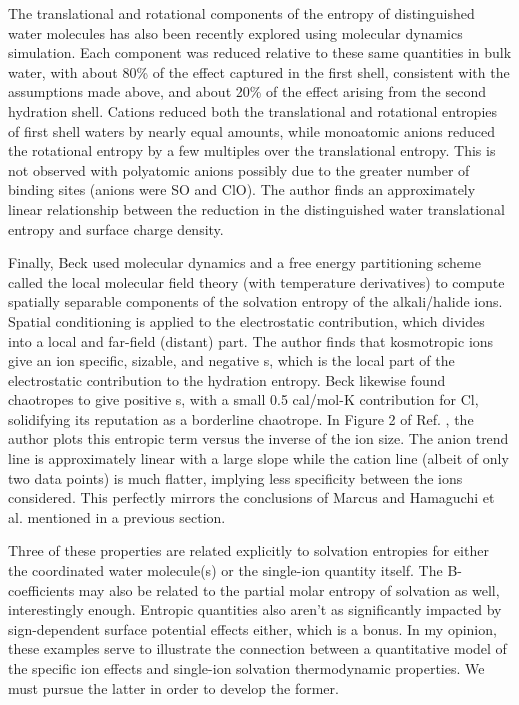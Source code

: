 \begin{intro}
    The translational and rotational components of the entropy of distinguished water molecules has also been recently explored using molecular dynamics 
    simulation\cite{saha2016impact}. Each component was reduced relative to these same quantities in bulk water, with about 80\% of the effect captured in the first shell, 
    consistent with the assumptions made above, and about 20\% of the effect arising from the second hydration shell. Cations reduced both the translational and rotational 
    entropies of first shell waters by nearly equal amounts, while monoatomic anions reduced the rotational entropy by a few multiples over the translational entropy. 
    This is not observed with polyatomic anions possibly due to the greater number of binding sites (anions were SO and ClO). The author finds
    an approximately linear relationship between the reduction in the distinguished water translational entropy and surface charge density.
    
    Finally, Beck used molecular dynamics and a free energy partitioning scheme called the local molecular field theory (with temperature derivatives) to compute spatially
    separable components of the solvation entropy of the alkali/halide ions\cite{beck2011lmft,beck2011local}. Spatial conditioning is applied to the electrostatic contribution,
    which divides into a local and far-field (distant) part. The author finds that kosmotropic ions give an ion specific, sizable, and negative s, which 
    is the local part of the electrostatic contribution to the hydration entropy. Beck likewise found chaotropes to give positive s, with a small 0.5 cal/mol-K 
    contribution for Cl\sur{-}, solidifying its reputation as a borderline chaotrope. In Figure 2 of Ref. \cite{beck2011local}, the author plots this entropic term versus the
    inverse of the ion size. The anion trend line is approximately linear with a large slope while the cation line (albeit of only two data points) is much flatter, implying  
    less specificity between the ions considered. This perfectly mirrors the conclusions of Marcus and Hamaguchi et al. mentioned in a previous 
    section\cite{hamaguchi1962effect,marcus2009effect}.

    Three of these properties are related explicitly to solvation entropies for either the coordinated water molecule(s) or the single-ion quantity itself. The B-coefficients
    may also be related to the partial molar entropy of solvation as well, interestingly enough\cite{nightingale1959phenomenological}. Entropic quantities also aren't as 
    significantly impacted by sign-dependent surface potential effects either, which is a bonus. In my opinion, these examples serve to illustrate the connection between a 
    quantitative model of the specific ion effects and single-ion solvation thermodynamic properties. We must pursue the latter in order to develop the former. 
    

\end{intro}
